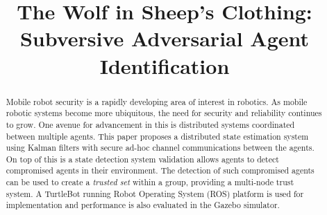 \documentclass[conference]{IEEEtran}
\begin{document}
%
\title{The Wolf in Sheep's Clothing:\\
Subversive Adversarial Agent Identification}


\author{
}



\maketitle

\begin{abstract}

Mobile robot security is a rapidly developing area of interest in robotics. As mobile robotic systems become more ubiquitous, the need for security and reliability continues to grow. One avenue for advancement in this is distributed systems coordinated between multiple agents. This paper proposes a distributed state estimation system using Kalman filters with secure ad-hoc channel communications between the agents. On top of this is a state detection system validation allows agents to detect compromised agents in their environment. The detection of such compromised agents can be used to create a \textit{trusted set} within a group, providing a multi-node trust system. A TurtleBot running Robot Operating System (ROS) platform is used for implementation and performance is also evaluated in the Gazebo simulator.

\end{abstract}
\end{document}
